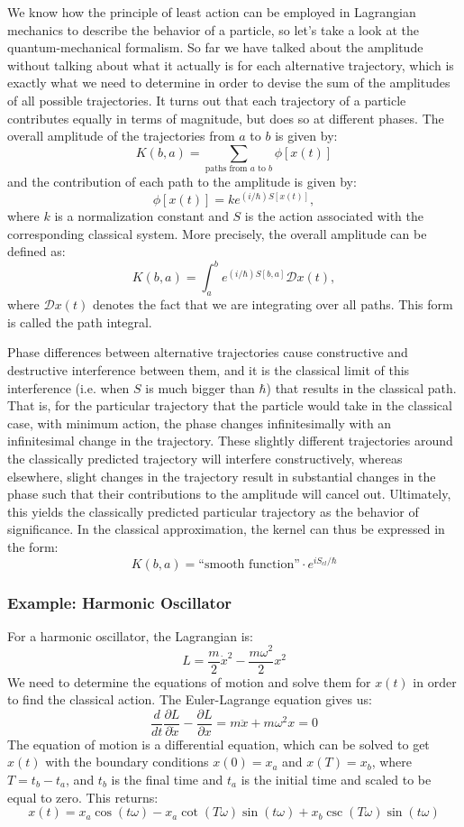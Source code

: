 \documentclass[12pt]{revtex4}
\begin{document}
We know how the principle of least action can be employed in Lagrangian mechanics to describe the behavior of a particle, so let's take a look at the quantum-mechanical formalism. So far we have talked about the amplitude without talking about what it actually is for each alternative trajectory, which is exactly what we need to determine in order to devise the sum of the amplitudes of all possible trajectories. It turns out that each trajectory of a particle contributes equally in terms of magnitude, but does so at different phases. The overall amplitude of the trajectories from $a$ to $b$ is given by:
\[ K(b,a) = \sum_{\text{paths from $a$ to $b$}} \phi [x(t)] \]
and the contribution of each path to the amplitude is given by:
\[ \phi [x(t)] = k e^{(i/\hbar)S[x(t)]}, \]
where $k$ is a normalization constant and $S$ is the action associated with the corresponding classical system. More precisely, the overall amplitude can be defined as:
\[ K(b,a) = \int_{a}^{b} e^{(i/\hbar)S[b, a]} \mathcal{D}x(t), \]
where $\mathcal{D}x(t)$ denotes the fact that we are integrating over all paths. This form is called the path integral.

Phase differences between alternative trajectories cause constructive and destructive interference between them, and it is the classical limit of this interference (i.e. when $S$ is much bigger than $\hbar$) that results in the classical path. That is, for the particular trajectory that the particle would take in the classical case, with minimum action, the phase changes infinitesimally with an infinitesimal change in the trajectory. These slightly different trajectories around the classically predicted trajectory will interfere constructively, whereas elsewhere, slight changes in the trajectory result in substantial changes in the phase such that their contributions to the amplitude will cancel out. Ultimately, this yields the classically predicted particular trajectory as the behavior of significance. In the classical approximation, the kernel can thus be expressed in the form:
\begin{equation} \label{sckernel}
K(b,a)=\text{``smooth function''}\cdot e^{iS_{cl}/\hbar}
\end{equation} 

\subsubsection{Example: Harmonic Oscillator}
For a harmonic oscillator, the Lagrangian is:
\[ L = \frac{m}{2}\dot{x}^2 - \frac{m \omega^2}{2}x^2 \]
We need to determine the equations of motion and solve them for $x(t)$ in order to find the classical action. The Euler-Lagrange equation gives us:
\begin{equation*}
\frac{d}{dt}\frac{\partial L}{\partial \dot{x}}-\frac{\partial L}{\partial x} = m\ddot{x}+m\omega^2x=0
\end{equation*}
The equation of motion is a differential equation, which can be solved to get $x(t)$ with the boundary conditions $x(0) = x_a$ and $x(T)=x_b$, where $T=t_b-t_a$, and $t_b$ is the final time and $t_a$ is the initial time and scaled to be equal to zero. This returns:
\[ x(t)= x_a \cos(t\omega) - x_a \cot(T \omega)\sin(t \omega)+x_b\csc(T \omega)\sin(t \omega) \]
\end{document}
